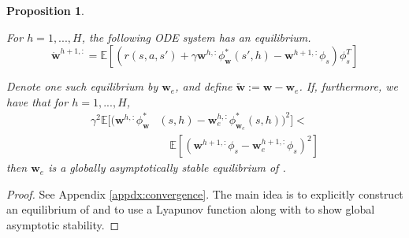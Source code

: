 \documentclass[letterpaper]{article} %
\newcommand{\Ex}{\mathbb{E}}
\newcommand{\params}{\mathbf{w}}
\newtheorem{proposition}{Proposition}
\begin{document}
\begin{proposition}\label{prop:ode}



For $h = 1, ..., H$, the following ODE system has an equilibrium.
\begin{equation}\label{eq:ode}
    \dot{\params}^{h + 1, :} = \Ex\left[(r(s, a, s') + \gamma \params^{h, :} \phi^*_{\params}(s', h) - \params^{h + 1, :} \phi_s)\phi_s^T\right]
\end{equation}

\noindent Denote one such equilibrium by $\params_e$, and define $\tilde{\params} := \params - \params_e$. If, furthermore, we have that for $h = 1, ..., H$,
\begin{align}\label{eq:ode-bound}
    \gamma^2 \Ex[(\params^{h, :} \phi^*_{\params}&(s, h) - \params_e^{h, :} \phi^*_{\params_e}(s, h))^2 ] <\\
    &\quad \Ex\left[(\params^{h + 1, :} \phi_s - \params_e^{h + 1, :} \phi_s)^2\right]\nonumber
\end{align}
\noindent then $\params_e$ is a globally asymptotically stable equilibrium of .

\end{proposition}

\begin{proof}
    See Appendix \ref{appdx:convergence}. The main idea is to explicitly construct an equilibrium of  and to use a Lyapunov function along with  to show global asymptotic stability.
\end{proof}
\end{document}
